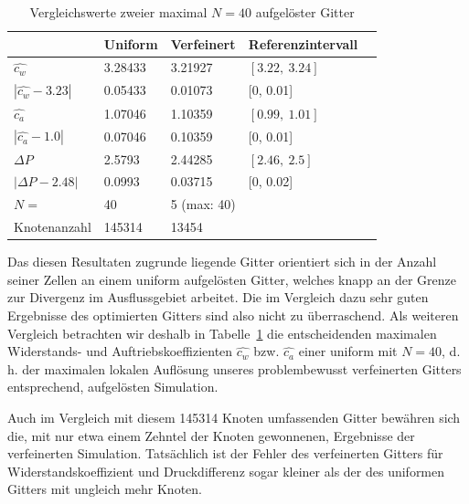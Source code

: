 \begin{table}[H]
\centering
{}
\begin{tabular}{l l l l l}
& Uniform & Verfeinert & Referenzintervall \cite{SchaeferTurek96} \\
\hline
\hline
\(\widehat{c_w}\) & \num{3.28433} & \num{3.21927} & \([\num[round-mode=off]{3.22},\ \num[round-mode=off]{3.24}]\) \\
\(|\widehat{c_w}-\num[round-mode=off]{3.23}|\) & \num{0.05433} & \num{0.01073} & [\num[round-mode=off]{0}, \num[round-mode=off]{0.01}] \\
\hline
\(\widehat{c_a}\) & \num{1.07046} & \num{1.10359} & \([\num[round-mode=off]{0.99},\ \num[round-mode=off]{1.01}]\) \\
\(|\widehat{c_a}-\num[round-mode=off]{1.0}|\) & \num{0.07046} & \num{0.10359} & [\num[round-mode=off]{0}, \num[round-mode=off]{0.01}]  \\
\hline
\(\Delta P\) & \num{2.5793} & \num{2.44285} & \([\num[round-mode=off]{2.46},\ \num[round-mode=off]{2.5}]\)  \\
\(|\Delta P-\num[round-mode=off]{2.48}|\) & \num{0.0993} & \num{0.03715} & [\num[round-mode=off]{0}, \num[round-mode=off]{0.02}] \\
\hline
\hline
\(N=\) & \num{40} & \num{5} (max: \num{40}) & \\
Knotenanzahl & \num{145314} & \num{13454} & \\
\end{tabular}
\caption{Vergleichswerte zweier maximal \(N=40\) aufgelöster Gitter}
\label{tab:cylinder2dComparison}
\end{table}

\newpage
Das diesen Resultaten zugrunde liegende Gitter orientiert sich in der Anzahl seiner Zellen an einem uniform aufgelösten Gitter, welches knapp an der Grenze zur Divergenz im Ausflussgebiet arbeitet. Die im Vergleich dazu sehr guten Ergebnisse des optimierten Gitters sind also nicht zu überraschend.
Als weiteren Vergleich betrachten wir deshalb in Tabelle~\ref{tab:cylinder2dComparison} die entscheidenden maximalen Widerstands- und Auftriebskoeffizienten \(\widehat{c_w}\) bzw. \(\widehat{c_a}\) einer uniform mit \(N=40\), d. h. der maximalen lokalen Auflösung unseres problembewusst verfeinerten Gitters entsprechend, aufgelösten Simulation.

Auch im Vergleich mit diesem \num{145314} Knoten umfassenden Gitter bewähren sich die, mit nur etwa einem Zehntel der Knoten gewonnenen, Ergebnisse der verfeinerten Simulation.
Tatsächlich ist der Fehler des verfeinerten Gitters für Widerstandskoeffizient und Druckdifferenz sogar kleiner als der des uniformen Gitters mit ungleich mehr Knoten.

